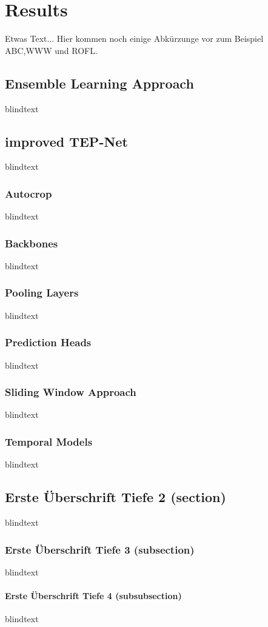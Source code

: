 \chapter{Results}
\label{sec:results}
Etwas Text... Hier kommen noch einige Abkürzunge vor zum Beispiel \ac{ABC},\ac{WWW} und \ac{ROFL}.

\section{Ensemble Learning Approach}
blindtext

\section{improved TEP-Net}
blindtext

\subsection{Autocrop}
blindtext

\subsection{Backbones}
blindtext

\subsection{Pooling Layers}
blindtext

\subsection{Prediction Heads}
blindtext

\subsection{Sliding Window Approach}
blindtext

\subsection{Temporal Models}
blindtext

\section{Erste Überschrift Tiefe 2 (section)}
blindtext

\subsection{Erste Überschrift Tiefe 3 (subsection)}
blindtext

\subsubsection{Erste Überschrift Tiefe 4 (subsubsection)}
blindtext

\cite{Wang.2022}